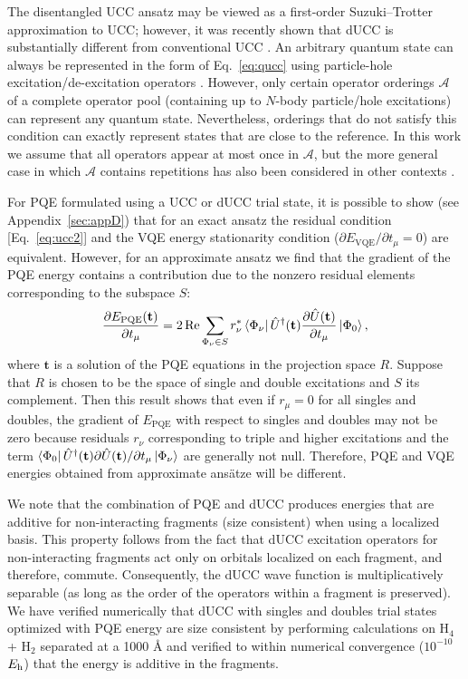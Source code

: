 \documentclass[aps,prx, reprint]{revtex4-2}
\newcommand*{\Eh}{$E_{\rm h}$\xspace}
\begin{document}
The disentangled UCC ansatz may be viewed as a first-order Suzuki--Trotter approximation to UCC; however, it was recently shown \cite{evangelista2019exact} that dUCC is substantially different from conventional UCC \cite{szalay1995alternative, taube2006new, cooper2010benchmark, evangelista2011alternative, harsha2018difference}.
An arbitrary quantum state can always be represented in the form of Eq.~\eqref{eq:qucc} using particle-hole excitation/de-excitation operators \cite{evangelista2019exact}.
However, only certain operator orderings $\mathcal{A}$ of a complete operator pool (containing up to $N$-body particle/hole excitations) can represent any quantum state.
Nevertheless, orderings that do not satisfy this condition can exactly represent states that are close to the reference.
In this work we assume that all operators appear at most once in $\mathcal{A}$, but the more general case in which $\mathcal{A}$ contains repetitions has also been considered in other contexts \cite{grimsley2019adaptive, lee2018generalized}.


For PQE formulated using a UCC or dUCC trial state, it is possible to show (see Appendix~\ref{sec:appD}) that for an exact ansatz the residual condition [Eq.~\eqref{eq:ucc2}] and the VQE energy stationarity condition ($\partial E_\mathrm{VQE} / \partial t_\mu = 0$) are equivalent.
However, for an approximate ansatz we find that the gradient of the PQE energy contains a contribution due to the nonzero residual elements corresponding to the subspace $S$:
\begin{equation}
\label{eq:grad_residual_connection}
\frac{\partial E_\mathrm{PQE}(\mathbf{t})}{\partial t_\mu}
= 2 \, \mathrm{Re} \sum_{\Phi_\nu \in S}
r_\nu^*
\bra{\Phi_\nu} \hat{U}^\dagger(\mathbf{t}) \frac{\partial \hat{U}(\mathbf{t})}{\partial t_\mu}  \ket{\Phi_0},
\end{equation}
where $\mathbf{t}$ is a solution of the PQE equations in the projection space $R$.
Suppose that $R$ is chosen to be the space of single and double excitations and $S$ its complement.
Then this result shows that even if $r_\mu = 0$ for all singles and doubles, the gradient of $E_\mathrm{PQE}$ with respect to singles and doubles may not be zero because residuals $r_\nu$ corresponding to triple and higher excitations and the term $\bra{\Phi_0} \hat{U}^\dagger(\mathbf{t}) \partial \hat{U}(\mathbf{t})/\partial t_\mu
\ket{\Phi_\nu}$ are generally not null. Therefore, PQE and VQE energies obtained from approximate ans\"{a}tze will be different.

We note that the combination of PQE and dUCC produces energies that are additive for non-interacting fragments (size consistent) when using a localized basis.
This property follows from the fact that dUCC excitation operators for non-interacting fragments act only on orbitals localized on each fragment, and therefore, commute. Consequently, the dUCC wave function is multiplicatively separable (as long as the order of the operators within a fragment is preserved).
We have verified numerically that dUCC with singles and doubles trial states optimized with PQE energy are size consistent by performing calculations on H$_4$ + H$_2$ separated at a 1000 \AA{} and verified to within numerical convergence ($10^{-10}$ \Eh) that the energy is additive in the fragments.
\end{document}

